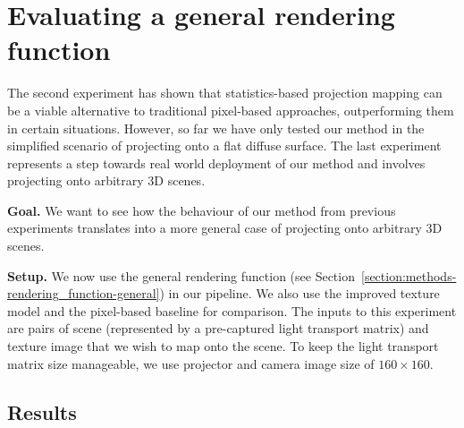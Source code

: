 \section{Evaluating a general rendering function}
\label{section:results-experiments-03}

The second experiment has shown that statistics-based projection mapping can be a viable alternative to traditional pixel-based approaches, outperforming them in certain situations. However, so far we have only tested our method in the simplified scenario of projecting onto a flat diffuse surface. The last experiment represents a step towards real world deployment of our method and involves projecting onto arbitrary 3D scenes.

\textbf{Goal.} We want to see how the behaviour of our method from previous experiments translates into a more general case of projecting onto arbitrary 3D scenes.

\textbf{Setup.} We now use the general rendering function (see Section~\ref{section:methods-rendering_function-general}) in our pipeline. We also use the improved texture model and the pixel-based baseline for comparison. The inputs to this experiment are pairs of scene (represented by a pre-captured light transport matrix) and texture image that we wish to map onto the scene. To keep the light transport matrix size manageable, we use projector and camera image size of \(160 \times 160\).

\subsection{Results}
\label{section:results-experiments-03-results}

